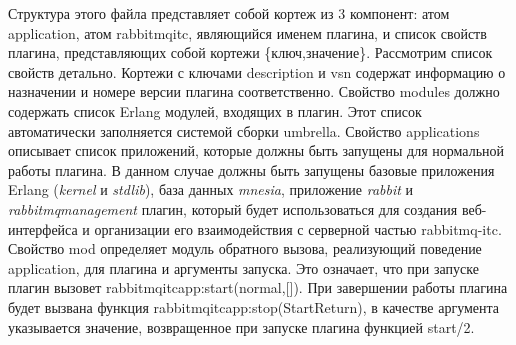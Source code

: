 Структура этого файла представляет собой кортеж из 3 компонент: атом application, атом rabbitmq\underline{\hspace{0.25cm}}itc, являющийся именем плагина, и список свойств плагина, представляющих собой кортежи \{ключ,значение\}. Рассмотрим список свойств детально. Кортежи с ключами description и vsn содержат информацию о назначении и номере версии плагина соответственно. Свойство modules должно содержать список Erlang модулей, входящих в плагин. Этот список автоматически заполняется системой сборки umbrella. Свойство applications описывает список приложений, которые должны быть запущены для нормальной работы плагина. В данном случае должны быть запущены базовые приложения Erlang (\textit{kernel} и \textit{stdlib}), база данных \textit{mnesia}, приложение \textit{rabbit} и \textit{rabbitmq\underline{\hspace{0.25cm}}management} плагин, который будет использоваться для создания веб-интерфейса и организации его взаимодействия с серверной частью rabbitmq-itc. Свойство mod определяет модуль обратного вызова, реализующий поведение application, для плагина и аргументы запуска. Это означает, что при запуске плагин вызовет rabbitmq\underline{\hspace{0.25cm}}itc\underline{\hspace{0.25cm}}app:start(normal,[]). При завершении работы плагина будет вызвана функция rabbitmq\underline{\hspace{0.25cm}}itc\underline{\hspace{0.25cm}}app:stop(StartReturn), в качестве аргумента указывается значение, возвращенное при запуске плагина функцией start/2.

